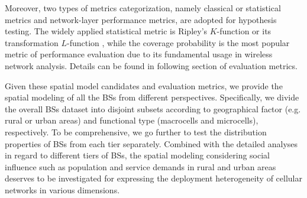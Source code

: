Moreover, two types of metrics categorization, namely classical or statistical metrics and network-layer performance metrics, are adopted for hypothesis testing. The widely applied statistical metric is Ripley's $K$-function or its transformation $L$-function \cite{ripley1977modelling}, while the coverage probability is the most popular metric of performance evaluation due to its fundamental usage in wireless network analysis. Details can be found in following section of evaluation metrics.

Given these spatial model candidates and evaluation metrics, we provide the spatial modeling of all the BSs from different perspectives. Specifically, we divide the overall BSs dataset into disjoint subsets according to geographical factor (e.g. rural or urban areas) and functional type (macrocells and microcells), respectively. To be comprehensive, we go further to test the distribution properties of BSs from each tier separately. Combined with the detailed analyses in regard to different tiers of BSs, the spatial modeling considering social influence such as population and service demands in rural and urban areas deserves to be investigated for expressing the deployment heterogeneity of cellular networks in various dimensions.

